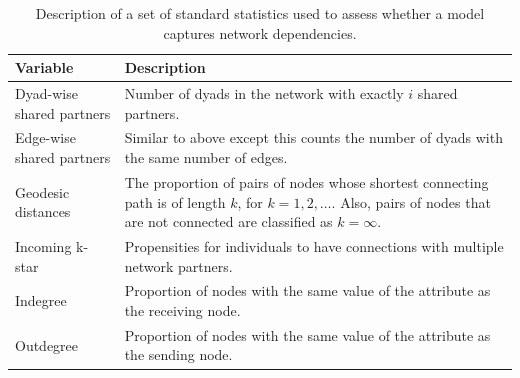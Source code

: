 \documentclass[12pt,pdflatex]{elsarticle}
\begin{document}
\begin{table}[ht]
\centering
\begingroup\scriptsize
\begin{tabular}{lL}
\footnotesize{\textbf{Variable}} & \footnotesize{\textbf{Description}} \\ \hline\hline
	Dyad-wise shared partners & Number of dyads in the network with exactly $i$ shared partners. \\
	Edge-wise shared partners & Similar to above except this counts the number of dyads with the same number of edges. \\
	Geodesic distances & The proportion of pairs of nodes whose shortest connecting path is of length $k$, for $k=1,2,\ldots$. Also, pairs of nodes that are not connected are classified as $k=\infty$. \\
	Incoming k-star & Propensities for individuals to have connections with multiple network partners. \\
	Indegree & Proportion of nodes with the same value of the attribute as the receiving node. \\
	Outdegree & Proportion of nodes with the same value of the attribute as the sending node. \\
\hline\hline
\end{tabular}
\endgroup
\caption{Description of a set of standard statistics used to assess whether a model captures network dependencies. }
\label{tab:netStat}
\end{table}
\FloatBarrier
\end{document}
